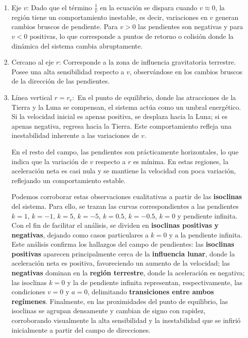 \documentclass[a4paper,10pt,twocolumn]{article}
\begin{document}
\begin{enumerate}
	\item Eje $v$: Dado que el término $\frac{1}{v}$ en la ecuación se dispara cuando $v\approx$0, la región tiene un comportamiento inestable, es decir, variaciones en $v$ generan cambios bruscos de pendiente. Para $v>0$ las pendientes son negativas y para $v<0$ positivas, lo que corresponde a puntos de retorno o colisión donde la dinámica del sistema cambia abruptamente.
	\item Cercano al eje $r$: Corresponde a la zona de influencia gravitatoria terrestre. Posee una alta sensibilidad respecto a $v$, observándose en los cambios bruscos de la dirección de las pendientes.
	\item Línea vertical $r=r_e:$ En el punto de equilibrio, donde las atracciones de la Tierra y la Luna se compensan, el sistema actúa como un umbral energético. Si la velocidad inicial es apenas positiva, se desplaza hacia la Luna; si es apenas negativa, regresa hacia la Tierra. Este comportamiento refleja una inestabilidad inherente a las variaciones de $v$.
    
    En el resto del campo, las pendientes son prácticamente horizontales, lo que indica que la variación de $v$ respecto a $r$ es mínima. En estas regiones, la aceleración neta es casi nula y se mantiene la velocidad con poca variación, reflejando un comportamiento estable. 

    Podemos corroborar estas observaciones cualitativas a partir de las \textbf{isoclinas} del sistema. Para ello, se trazan las curvas correspondientes a las pendientes $k = 1$, $k = -1$, $k = 5$, $k = -5$, $k = 0.5$, $k = -0.5$, $k = 0$ y pendiente infinita. Con el fin de facilitar el análisis, se dividen en \textbf{isoclinas positivas y negativas}, dejando como casos particulares a $k = 0$ y a la pendiente infinita. 
    Este análisis confirma los hallazgos del campo de pendientes: las \textbf{isoclinas positivas} aparecen principalmente cerca de la \textbf{influencia lunar}, donde la aceleración neta es positiva, favoreciendo un aumento de la velocidad; las \textbf{negativas} dominan en la \textbf{región terrestre}, donde la aceleración es negativa; las isoclinas $k = 0$ y la de pendiente infinita representan, respectivamente, las condiciones $v = 0$ y $a = 0$, delimitando \textbf{transiciones entre ambos regímenes}. Finalmente, en las proximidades del punto de equilibrio, las isoclinas se agrupan densamente y cambian de signo con rapidez, corroborando visualmente la alta sensibilidad y la inestabilidad que se infirió inicialmente a partir del campo de direcciones.
    
\end{enumerate}

\label{end}
\end{document}
